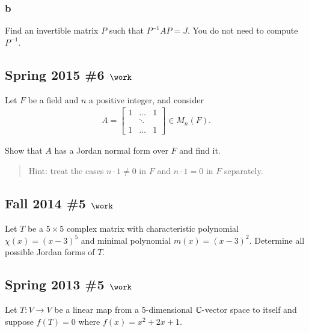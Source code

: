 \hypertarget{b-104}{%
\subsubsection{b}\label{b-104}}

Find an invertible matrix \(P\) such that \(P^{-1}A P = J\). You do not
need to compute \(P^{-1}\).

\hypertarget{spring-2015-6-work}{%
\subsection{\texorpdfstring{Spring 2015 \#6
\(\work\)}{Spring 2015 \#6 \textbackslash work}}\label{spring-2015-6-work}}

Let \(F\) be a field and \(n\) a positive integer, and consider
\begin{align*}
A=\left[\begin{array}{ccc}
1 & \dots & 1 \\
& \ddots & \\
1 & \dots & 1
\end{array}\right] \in M_{n}(F)
.\end{align*}

Show that \(A\) has a Jordan normal form over \(F\) and find it.

\begin{quote}
Hint: treat the cases \(n\cdot 1 \neq 0\) in \(F\) and \(n\cdot 1 = 0\)
in \(F\) separately.
\end{quote}

\hypertarget{fall-2014-5-work}{%
\subsection{\texorpdfstring{Fall 2014 \#5
\(\work\)}{Fall 2014 \#5 \textbackslash work}}\label{fall-2014-5-work}}

Let \(T\) be a \(5\times 5\) complex matrix with characteristic
polynomial \(\chi(x) = (x-3)^5\) and minimal polynomial
\(m(x) = (x-3)^2\). Determine all possible Jordan forms of \(T\).

\hypertarget{spring-2013-5-work}{%
\subsection{\texorpdfstring{Spring 2013 \#5
\(\work\)}{Spring 2013 \#5 \textbackslash work}}\label{spring-2013-5-work}}

Let \(T: V\to V\) be a linear map from a 5-dimensional
\({\mathbb{C}}{\hbox{-}}\)vector space to itself and suppose
\(f(T) = 0\) where \(f(x) = x^2 + 2x + 1\).

